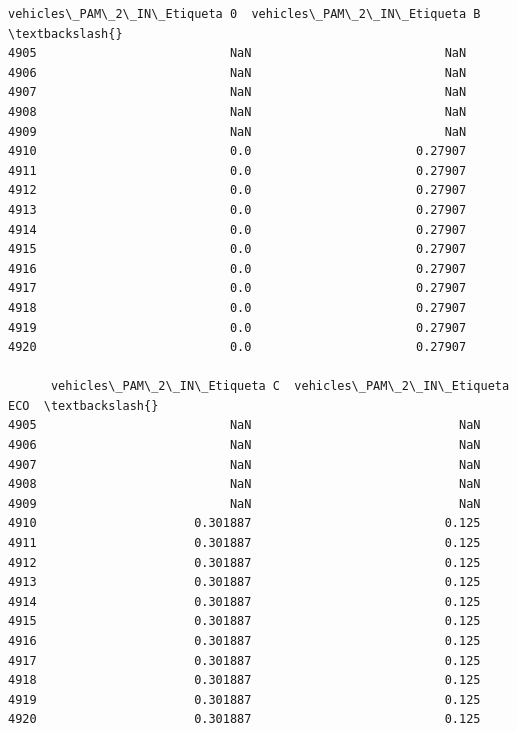 \documentclass[11pt]{article}
\begin{document}
\begin{tcolorbox}[breakable, size=fbox, boxrule=.5pt, pad at break*=1mm, opacityfill=0]
\begin{Verbatim}[commandchars=\\\{\}]
      vehicles\_PAM\_2\_IN\_Etiqueta 0  vehicles\_PAM\_2\_IN\_Etiqueta B  \textbackslash{}
4905                           NaN                           NaN
4906                           NaN                           NaN
4907                           NaN                           NaN
4908                           NaN                           NaN
4909                           NaN                           NaN
4910                           0.0                       0.27907
4911                           0.0                       0.27907
4912                           0.0                       0.27907
4913                           0.0                       0.27907
4914                           0.0                       0.27907
4915                           0.0                       0.27907
4916                           0.0                       0.27907
4917                           0.0                       0.27907
4918                           0.0                       0.27907
4919                           0.0                       0.27907
4920                           0.0                       0.27907

      vehicles\_PAM\_2\_IN\_Etiqueta C  vehicles\_PAM\_2\_IN\_Etiqueta ECO  \textbackslash{}
4905                           NaN                             NaN
4906                           NaN                             NaN
4907                           NaN                             NaN
4908                           NaN                             NaN
4909                           NaN                             NaN
4910                      0.301887                           0.125
4911                      0.301887                           0.125
4912                      0.301887                           0.125
4913                      0.301887                           0.125
4914                      0.301887                           0.125
4915                      0.301887                           0.125
4916                      0.301887                           0.125
4917                      0.301887                           0.125
4918                      0.301887                           0.125
4919                      0.301887                           0.125
4920                      0.301887                           0.125


\end{Verbatim}
\end{tcolorbox}
\end{document}
